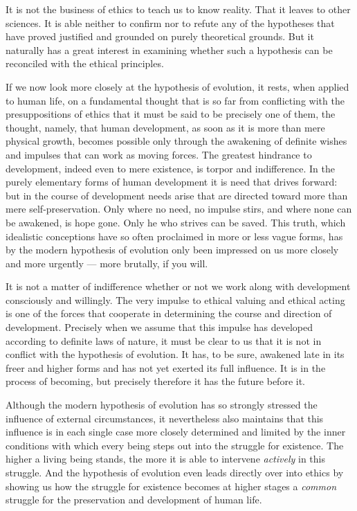 \documentclass[12pt,a4paper,openany]{book}
\newcommand{\opage}[1]{\marginnote{\footnotesize\textit{[#1]}}}
\begin{document}
It is not the business of ethics to teach us to know reality. That it leaves to other sciences. It is
able neither to confirm nor to refute any of the hypotheses that have proved justified and grounded on
purely theoretical grounds. But it naturally has a great interest in examining whether such a hypothesis
can be reconciled with the ethical principles.

If we now look more closely at the hypothesis of evolution, it rests, when applied to human life, on a
fundamental thought that is so far from conflicting with the presuppositions of ethics that it must be
said to be precisely one of them, the thought, namely, that human development, as soon as it is more
than mere physical growth, becomes possible only through the awakening of definite wishes and impulses
that can work as moving forces. The greatest hindrance to development, indeed even to mere existence, is
torpor and indifference. In the purely elementary forms of human development it is need that drives
forward: but in the course of development needs arise that are directed toward more than mere
self-preservation. Only where no need, no impulse stirs, and where none can be awakened, is hope gone.
Only he who strives can be saved. This truth, which idealistic conceptions have so often proclaimed in
more or less vague forms, has by
\opage{102}the modern hypothesis of evolution only been impressed on us more closely and more urgently --- more
brutally, if you will.

It is not a matter of indifference whether or not we work along with development consciously and
willingly. The very impulse to ethical valuing and ethical acting is one of the forces that cooperate
in determining the course and direction of development. Precisely when we assume that this impulse has
developed according to definite laws of nature, it must be clear to us that it is not in conflict with
the hypothesis of evolution. It has, to be sure, awakened late in its freer and higher forms and has not
yet exerted its full influence. It is in the process of becoming, but precisely therefore it has the
future before it.

Although the modern hypothesis of evolution has so strongly stressed the influence of external
circumstances, it nevertheless also maintains that this influence is in each single case more closely
determined and limited by the inner conditions with which every being steps out into the struggle for
existence. The higher a living being stands, the more it is able to intervene \textit{actively} in this
struggle. And the hypothesis of evolution even leads directly over into ethics by showing us how the
struggle for existence becomes at higher stages a \textit{common} struggle for the preservation and
development of human life.
\end{document}
